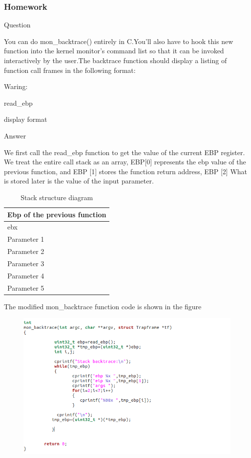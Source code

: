 \subsubsection{Homework }
\begin{flushleft}
{\Large Question}
\end{flushleft}

You can do mon\_backtrace() entirely in C.You'll also have to hook this new function into the kernel monitor's command list so that it can be invoked interactively by the user.The backtrace function should display a listing of function call frames in the following format:

Waring:

read\_ebp

display format

\begin{flushleft}
{\Large Answer}
\end{flushleft}



We first call the read\_ebp function to get the value of the current EBP register. We treat the entire call stack as an array, EBP[0] represents the ebp value of the previous function, and EBP [1] stores the function return address, EBP [2] What is stored later is the value of the input parameter.

\begin{table}[H]
\centering
\begin{tabular}{ |p{150pt}| }
\hline			
Ebp of the previous function  \\ \hline		
ebx \\ \hline 		
Parameter 1 \\ \hline 	
Parameter 2 \\ \hline
Parameter 3 \\ \hline
Parameter 4 \\ \hline
Parameter 5 \\ \hline
\end{tabular}
\caption{Stack structure diagram}
\end{table}

The modified mon\_backtrace function code is shown in the figure
\begin{figure}[H]
  \centering
  \includegraphics[width=0.8\linewidth]{figure/mon_backtrace_code}
\end{figure}

